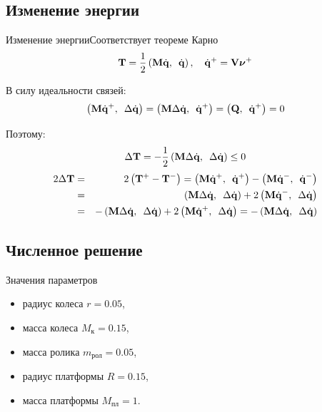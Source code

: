 \documentclass{beamer}
\begin{document}
\subsection{Изменение энергии}

\begin{frame}{Изменение энергии}{Соответствует теореме Карно}
    $$ \eqTquad, \quad \eqDqVnu $$

    В силу идеальности связей:
    $$ \logicWorkZero $$
    
    Поэтому:
        $$ \eqDeltaT $$
    \begin{eqnarray*}
        2\Delta\ke & = & 2\left(\ke^+ - \ke^-\right) = \dotp{\mke\dqposle}{\dqposle} - \dotp{\mke\dqdo}{\dqdo} \\
        & = & \dotp{\mke\deltadq}{\deltadq} + 2\dotp{\mke\dqdo}{\deltadq} \\
        & = & -\dotp{\mke\deltadq}{\deltadq} + 2\dotp{\mke\dqposle}{\deltadq} = -\dotp{\mke\deltadq}{\deltadq}
    \end{eqnarray*}
\end{frame}

\subsection{Численное решение}

\begin{frame}{Значения параметров}
    \begin{itemize}
        \item радиус колеса $r = 0.05$,
        \item масса колеса $ M_{\text{к}} = 0.15$, 
        \item масса ролика $m_{\text{рол}} = 0.05$, 
        \item радиус платформы $R = 0.15$, 
        \item масса платформы $M_{\text{пл}} = 1$.
    \end{itemize}
\end{frame}
\end{document}
